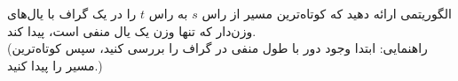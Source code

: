الگوریتمی ارائه دهید که کوتاه‌ترین مسیر از راس $s$ به راس $t$ را در یک گراف با یال‌های وزن‌دار که تنها وزن یک یال منفی است، پیدا کند. 
\\
(راهنمایی: ابتدا وجود دور با طول منفی در گراف را بررسی کنید، سپس کوتاه‌ترین مسیر را پیدا کنید.)